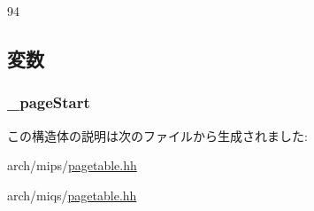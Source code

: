 \begin{DoxyCode}
94 {}
\end{DoxyCode}


\subsection{変数}
\hypertarget{structMipsISA_1_1TlbEntry_ad8da2710e276585b6631902816b5284f}{
\subsubsection[{\_\-pageStart}]{ {\bf \_\-pageStart}}}
\label{structMipsISA_1_1TlbEntry_ad8da2710e276585b6631902816b5284f}


この構造体の説明は次のファイルから生成されました:\begin{DoxyCompactItemize}
\item 
arch/mips/\hyperlink{mips_2pagetable_8hh}{pagetable.hh}\item 
arch/miqs/\hyperlink{miqs_2pagetable_8hh}{pagetable.hh}\end{DoxyCompactItemize}
